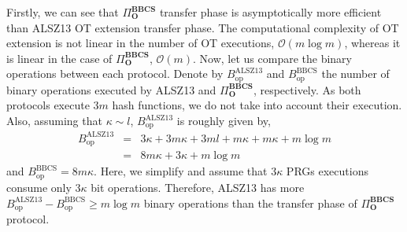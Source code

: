 Firstly, we can see that $\Pi^{\textbf{BBCS}}_{\textbf{O}}$ transfer phase is asymptotically more efficient than ALSZ13 OT extension transfer phase. The computational complexity of OT extension is not linear in the number of OT executions, $\mathcal{O}(m\log m)$, whereas it is linear in the case of $\Pi^{\textbf{BBCS}}_{\textbf{O}}$, $\mathcal{O}(m)$. Now, let us compare the binary operations between each protocol. Denote by $B_{\text{op}}^\text{ALSZ13}$ and $B_{\text{op}}^\text{BBCS}$ the number of binary operations executed by ALSZ13 and $\Pi^{\textbf{BBCS}}_{\textbf{O}}$, respectively. As both protocols execute $3m$ hash functions, we do not take into account their execution. Also, assuming that $\kappa \sim l$, $B_{\text{op}}^\text{ALSZ13}$ is roughly given by,
\begin{eqnarray*}
    B_{\text{op}}^\text{ALSZ13} &=& 3\kappa + 3m\kappa + 3 m l + m\kappa + m\kappa + m \log m \\
    &=& 8 m \kappa + 3 \kappa + m\log m 
\end{eqnarray*}
and $B_{\text{op}}^\text{BBCS} = 8 m \kappa$. Here, we simplify and assume that $3\kappa$ PRGs executions consume only $3\kappa$ bit operations. Therefore, ALSZ13 has more $B_{\text{op}}^\text{ALSZ13} - B_{\text{op}}^\text{BBCS}  \geq m\log m $ binary operations than the transfer phase of $\Pi^{\textbf{BBCS}}_{\textbf{O}}$ protocol. 



